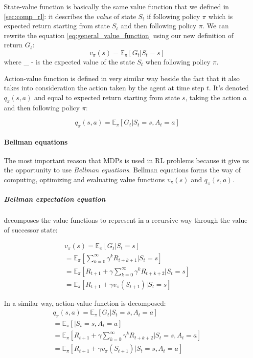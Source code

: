 State-value function is basically the same value function that we defined in \autoref{sec:comp_rl}:
it describes the \emph{value} of state $S_t$ if following policy $\pi$ which is expected return
starting from state $S_t$ and then following policy $\pi$. We can rewrite the equation \ref{eq:general_value_function}
using our new definition of return $G_t$:
\begin{equation} \label{eq:value_state}
	v_{\pi}(s) = \mathbb{E}_{\pi} [G_t |S_t = s]
\end{equation}
where _{\pi} - is the expected value of the state $S_t$ when
following policy $\pi$.

Action-value function is defined in very similar way beside the fact that it also takes
into consideration the action taken by the agent at time step $t$. It's denoted $q_{\pi}(s, a)$
and equal to expected return starting from state $s$, taking the action $a$ and then following
policy $\pi$:

\begin{equation} \label{eq:action_value_func}
	q_{\pi}(s, a) = \mathbb{E}_{\pi} [G_t |S_t = s, A_t = a]
\end{equation}

\paragraph{Bellman equations} The most important reason that MDPs is used in RL problems because
it give us the opportunity to use \emph{Bellman equations}. Bellman equations forms the way
of computing, optimizing and evaluating value functions $v_{\pi}(s)$ and $q_{\pi}(s, a)$.

\subparagraph{Bellman expectation equation} decomposes the value functions to represent
in a recursive way through the value of successor state:

\begin{align*}
	v_{\pi}(s) = \mathbb{E}_{\pi} [G_t |S_t = s] \\
		= \mathbb{E}_{\pi} [\sum_{k=0}^{\infty} \gamma^k R_{t+k+1} |S_t = s] \\
		= \mathbb{E}_{\pi} [R_{t+1} + \gamma \sum_{k=0}^{\infty} \gamma^k R_{t+k+2} |S_t = s] \\
		= \mathbb{E}_{\pi} [R_{t+1} + \gamma v_{\pi}(S_{t+1}) | S_t = s]
\end{align*}

In a similar way, action-value function is decomposed:
\begin{align*}
	q_{\pi}(s, a) = \mathbb{E}_{\pi} [G_t |S_t = s, A_t = a] \\
		= \mathbb{E}_{\pi} [ |S_t = s, A_t = a] \\
		= \mathbb{E}_{\pi} [R_{t+1} + \gamma \sum_{k=0}^{\infty} \gamma^k R_{t+k+2} |S_t = s, A_t = a] \\
		= \mathbb{E}_{\pi} [R_{t+1} + \gamma v_{\pi}(S_{t+1}) | S_t = s, A_t = a]
\end{align*}

